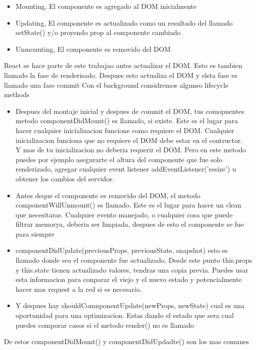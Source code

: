 \begin{itemize}
  \item Mounting, El componente es agregado al DOM inicialmente 
  \item Updating, El componente es actualizado como un resultado del llamado setState() y/o proyendo prop al componente cambiado\\
  \item Unmounting, El componente es removido del DOM
\end{itemize}
React se hace parte de este trabajao antes actualizar el DOM. Esto es tambien llamado la fase de renderisado. Despues esto actualiza el DOM y elsta fase es llamado una fase commit Con el background considremos algunso lifecycle methods
\begin{itemize}
    \item Despues del montaje inicial y despues de commit el DOM, tus comopnentes metodo componentDidMount() es llamado, si existe. Este es el lugar para hacer cualquier inicializacion funcione como requiere el DOM. Cualquier inicializacion funciona que no requiere el DOM debe estar en el contructor.\\
    Y mas de tu inicializacion no deberia requerir el DOM. Pero en este metodo puedes por ejemplo asegurarte el altura del componente que fue solo renderizado, agregar cualquier event listener addEventListener('resize') u obtener los cambios del servidor.
    \item Antes deque el componente es removido del DOM, el metodo componentWillUnmount() es llamado. Este es el lugar para hacer un clean que necesitaras. Cualquier evento manejado, o cualquier cosa que puede filtrar memorya, deberia ser limpiada, despues de esto el componente se fue para siempre
    \item componentDidUpdate(previousProps, previousState, snapshot) esto es llamado donde sea el componente fue actualizado. Desde este punto this.props y this.state tienen actualizado valores, tendras una copia previa. Puedes usar esta informacion para conparar el viejo y el nuevo estado y potencialmente hacer mas request a la red si es necesario.
    \item Y despues hay shouldComnponentUpdate(newProps, newState) cual es una oportunidad para una optimizacion. Estas dando el estado que sera cual puedes comporar casos si el metodo render() no es llamado
\end{itemize}
De estos componentDidMount() y componentDidUpdadte() son los mas comunes
